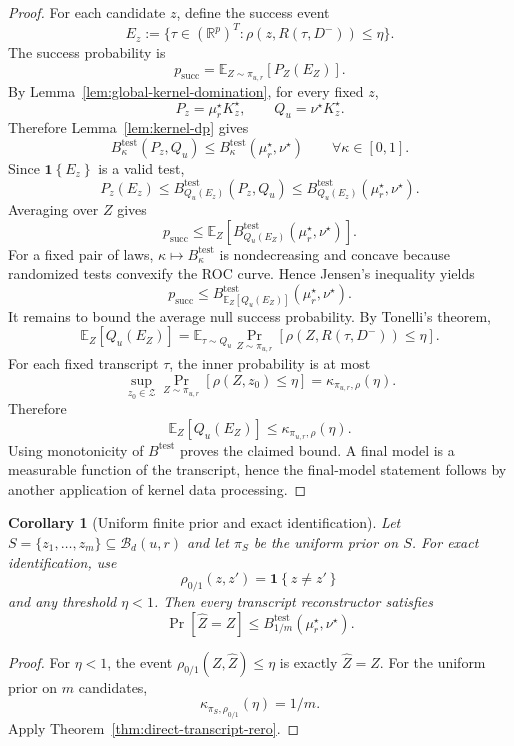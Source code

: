 \documentclass[conference,compsoc]{IEEEtran}
\newtheorem{corollary}{Corollary}
\newcommand{\ind}[1]{\mathbf{1}\!\left\{#1\right\}}
\newcommand{\R}{\mathbb{R}}
\newcommand{\cZ}{\mathcal{Z}}
\newcommand{\cB}{\mathcal{B}}
\begin{document}
\begin{proof}
For each candidate $z$, define the success event
\[
E_z:=\{\tau\in(\R^p)^T:\rho(z,R(\tau,D^-))\le\eta\}.
\]
The success probability is
\[
p_{\mathrm{succ}}=\mathbb E_{Z\sim\pi_{u,r}}[P_Z(E_Z)].
\]
By Lemma~\ref{lem:global-kernel-domination}, for every fixed $z$,
\[
P_z=\mu_r^\star K_z^\star,
\qquad
Q_u=\nu^\star K_z^\star.
\]
Therefore Lemma~\ref{lem:kernel-dp} gives
\[
B_\kappa^{\mathrm{test}}(P_z,Q_u)
\le
B_\kappa^{\mathrm{test}}(\mu_r^\star,\nu^\star)
\qquad\forall\kappa\in[0,1].
\]
Since $\ind{E_z}$ is a valid test,
\[
P_z(E_z)
\le
B_{Q_u(E_z)}^{\mathrm{test}}(P_z,Q_u)
\le
B_{Q_u(E_z)}^{\mathrm{test}}(\mu_r^\star,\nu^\star).
\]
Averaging over $Z$ gives
\[
p_{\mathrm{succ}}
\le
\mathbb E_Z\left[B_{Q_u(E_Z)}^{\mathrm{test}}(\mu_r^\star,\nu^\star)\right].
\]
For a fixed pair of laws, $\kappa\mapsto B_\kappa^{\mathrm{test}}$ is nondecreasing and concave because randomized tests convexify the ROC curve. Hence Jensen's inequality yields
\[
p_{\mathrm{succ}}
\le
B_{\mathbb E_Z[Q_u(E_Z)]}^{\mathrm{test}}(\mu_r^\star,\nu^\star).
\]
It remains to bound the average null success probability. By Tonelli's theorem,
\[
\mathbb E_Z[Q_u(E_Z)]
=
\mathbb E_{\tau\sim Q_u}
\Pr_{Z\sim\pi_{u,r}}[\rho(Z,R(\tau,D^-))\le\eta].
\]
For each fixed transcript $\tau$, the inner probability is at most
\[
\sup_{z_0\in\cZ}\Pr_{Z\sim\pi_{u,r}}[\rho(Z,z_0)\le\eta]
=\kappa_{\pi_{u,r},\rho}(\eta).
\]
Therefore
\[
\mathbb E_Z[Q_u(E_Z)]\le\kappa_{\pi_{u,r},\rho}(\eta).
\]
Using monotonicity of $B^{\mathrm{test}}$ proves the claimed bound. A final model is a measurable function of the transcript, hence the final-model statement follows by another application of kernel data processing.
\end{proof}

\begin{corollary}[Uniform finite prior and exact identification]
\label{cor:finite-prior}
Let $S=\{z_1,\ldots,z_m\}\subseteq\cB_d(u,r)$ and let $\pi_S$ be the uniform prior on $S$. For exact identification, use
\[
\rho_{0/1}(z,z')=\ind{z\ne z'}
\]
and any threshold $\eta<1$. Then every transcript reconstructor satisfies
\[
\Pr[\widehat Z=Z]
\le
B_{1/m}^{\mathrm{test}}(\mu_r^\star,\nu^\star).
\]
\end{corollary}

\begin{proof}
For $\eta<1$, the event $\rho_{0/1}(Z,\widehat Z)\le\eta$ is exactly $\widehat Z=Z$. For the uniform prior on $m$ candidates,
\[
\kappa_{\pi_S,\rho_{0/1}}(\eta)=1/m.
\]
Apply Theorem~\ref{thm:direct-transcript-rero}.
\end{proof}
\end{document}
